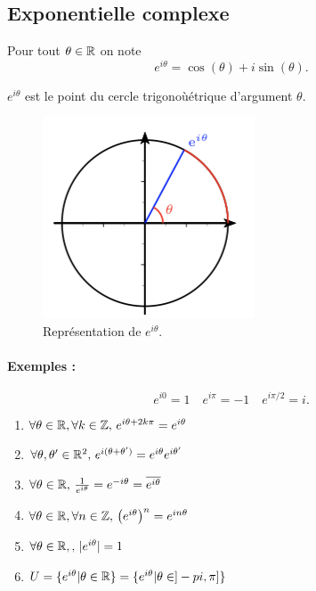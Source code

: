 \documentclass[a4paper, 11pt]{article}
\begin{document}
\subsection{Exponentielle complexe}
\begin{defi}
Pour tout $\theta \in \mathbb{R}$  on note 
$$e^{i\theta} =\cos(\theta) +i \sin(\theta).$$
\end{defi}
\begin{remarques}
\item $e^{i\theta}$ est le point du cercle trigonoùétrique d'argument $\theta$. 
\end{remarques}


\begin{figure}[h]
\centering
\includegraphics[scale=0.8]{images/eitheta}
\vspace{-0.4cm}
\caption{Représentation de $e^{i\theta}$.}
\end{figure}


\paragraph{Exemples :}
$$e^{i0}=1\quad e^{i\pi} =-1\quad e^{i\pi/2} =i.$$ 

\begin{prop}
\begin{enumerate}
\item $\forall \theta \in \mathbb{R}, \forall k\in \mathbb{Z}, \, e^{i\theta+2k\pi} =e^{i\theta}$
\item $\forall \theta , \theta'\in \mathbb{R}^2,  \, e^{i(\theta+\theta')} =e^{i\theta}e^{i\theta'}$
\item $\forall \theta \in \mathbb{R},\, \frac{1}{e^{i\theta}} =e^{-i\theta}=\overline{e^{i\theta}}$
\item $\forall \theta \in \mathbb{R}, \forall n\in \mathbb{Z}, \, \left(e^{i\theta}\right)^n =e^{in\theta}$
\item $\forall \theta \in \mathbb{R}, , \, |e^{i\theta}| =1$
\item $U = \{ e^{i\theta} | \theta \in \mathbb{R}\} = \{ e^{i\theta} | \theta \in ]-pi, \pi]\}$
\end{enumerate}
\end{prop}
\end{document}
